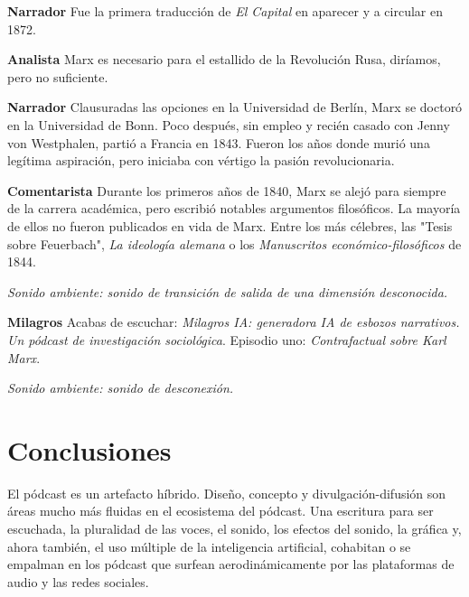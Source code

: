 \documentclass[
  spanish,
  11pt,
  a4paper,
]{scrbook}
\newenvironment{transcripcion}{
    \begin{list}{}{
        \setlength{\leftmargin}{1.5em}  %
        \setlength{\rightmargin}{0em}
        \setlength{\itemsep}{0.2em}     %
        \setlength{\parsep}{0.0em}
        \setlength{\listparindent}{0pt}
    }
}{
    \end{list}
}
\newcommand{\personaje}[1]{\textbf{#1}\quad}
\newcommand{\escena}[1]{\textit{\small #1}\par\vspace{0.4em}}
\begin{document}
\begin{transcripcion}
\item \personaje{Narrador} Fue la primera traducción de \textit{El Capital} en aparecer y a circular en 1872.

\item \personaje{Analista} Marx es necesario para el estallido de la Revolución Rusa, diríamos, pero no suficiente.

\item \personaje{Narrador} Clausuradas las opciones en la Universidad de Berlín, Marx se doctoró en la Universidad de Bonn. Poco después, sin empleo y recién casado con Jenny von Westphalen, partió a Francia en 1843. Fueron los años donde murió una legítima aspiración, pero iniciaba con vértigo la pasión revolucionaria.

\item \personaje{Comentarista} Durante los primeros años de 1840, Marx se alejó para siempre de la carrera académica, pero escribió notables argumentos filosóficos. La mayoría de ellos no fueron publicados en vida de Marx. Entre los más célebres, las "Tesis sobre Feuerbach", \textit{La ideología alemana} o los \textit{Manuscritos económico-filosóficos} de 1844.

\item \escena{Sonido ambiente: sonido de transición de salida de una dimensión desconocida.}

\item \personaje{Milagros} Acabas de escuchar: \textit{Milagros IA: generadora IA de esbozos narrativos. Un pódcast de investigación sociológica}. Episodio uno: \textit{Contrafactual sobre Karl Marx}.

\item \escena{Sonido ambiente: sonido de desconexión.}
\end{transcripcion}

\section*{Conclusiones}\label{conclusiones-2}


El pódcast es un artefacto híbrido. Diseño, concepto y
divulgación-difusión son áreas mucho más fluidas en el ecosistema del
pódcast. Una escritura para ser escuchada, la pluralidad de las voces,
el sonido, los efectos del sonido, la gráfica y, ahora también, el uso
múltiple de la inteligencia artificial, cohabitan o se empalman en los
pódcast que surfean aerodinámicamente por las plataformas de audio y las
redes sociales.
\end{document}
